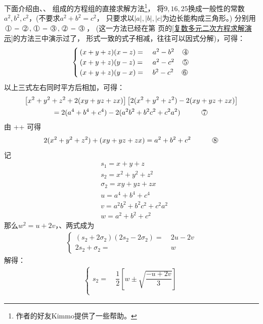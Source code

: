 \begin{enumerate}[label={【\textbf{例\thechapter.\arabic*}】},
 leftmargin=\inteval{\myenumleftmargin}pt,
 itemsep=\inteval{\myenumitempsep}pt,
 itemindent=\inteval{\myenumitemindent}pt]
下面介绍由、、
组成的方程组的直接求解方法\footnote{作者的好友Kimmo提供了一些帮助。}，
将$ 9,16,25 $换成一般性的常数$ a^2,b^2,c^2 $，(不要求$ a^2+b^2=c^2 $，
只要求以$ |a|,|b|,|c| $为边长能构成三角形。)
分别用$ \mycircled{1}-\mycircled{2},
\mycircled{1}-\mycircled{3},\mycircled{2}-\mycircled{3} $，
(这一方法已经在第\pageref{复数多元二次方程求解演示} 
页的\ref{复数多元二次方程求解演示}的方法三中演示过了，
形式一致的式子相减，往往可以因式分解)，可得：
\begin{align*}
    \begin{cases}
        (x+y+z)(x-z)=&\ a^2-b^2 \q \mycircled{4}  \\
        (x+y+z)(y-z)=&\ a^2-c^2 \q \mycircled{5}  \\
        (x+y+z)(y-x)=&\ b^2-c^2 \q \mycircled{6} 
    \end{cases}
\end{align*}
以上三式左右同时平方后相加，可得：
\begin{gather*}
    \left[ x^2+y^2+z^2+2(xy+yz+zx) \right] \left[ 2(x^2+y^2+z^2)-2(xy+yz+zx) \right] \\
    =2(a^4+b^4+c^4)-2(a^2b^2+b^2c^2+c^2a^2) \hspace{1cm} \mycircled{7}
\end{gather*}
由 ++ 可得
\begin{align*}
    2(x^2+y^2+z^2)+(xy+yz+zx)=a^2+b^2+c^2  \hspace{1cm} \mycircled{8}
\end{align*}
记
\begin{align*}
    & s_1=x+y+z \\
    & s_2=x^2+y^2+z^2 \\
    & \sigma_2=xy+yz+zx  \\
    & u=a^4+b^4+c^4 \\
    & v=a^2b^2+b^2c^2+c^2a^2 \\
    & w=a^2+b^2+c^2
\end{align*}
那么$ w^2=u+2v $，、两式成为
\begin{align*}
    \begin{cases}
        (s_2+2\sigma_2)(2s_2-2\sigma_2)=&\ 2u-2v \\
        2s_2+\sigma_2 =&\ w
    \end{cases}
\end{align*}
解得：
\begin{align*}
    \begin{cases}
        s_2 =&\  \dfrac{1}{2}\left[w \pm \sqrt{\dfrac{-u+2v}{3}}\right] \\

\end{cases}
\end{align*}
\end{enumerate}
